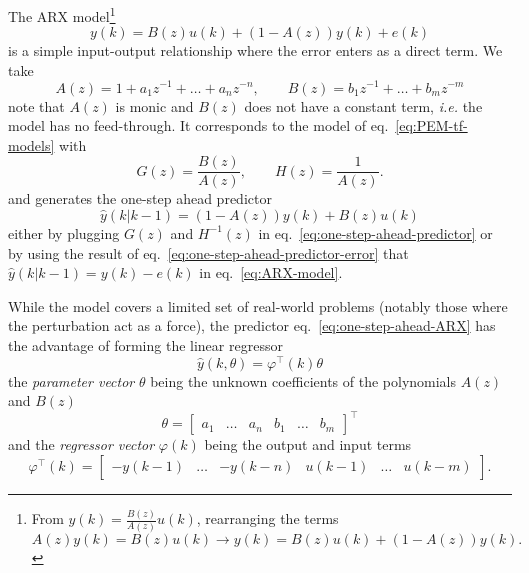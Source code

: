 The ARX model\footnote{From $y(k) = \frac{B(z)}{A(z)}u(k)$, rearranging the terms
  \begin{equation*}
     A(z)y(k) = B(z)u(k) \rightarrow y(k) = B(z)u(k) + (1-A(z))y(k).
  \end{equation*}}
\begin{equation}
  \label{eq:ARX-model}
  y(k) = B(z)u(k) + \left(1-A(z)\right)y(k) + e(k)
\end{equation}
is a simple input-output relationship where the error enters as a direct term. We take
\begin{equation*}
  A(z) = 1 + a_1z^{-1} + \ldots + a_nz^{-n},\hspace{2em} B(z) = b_1z^{-1} + \ldots + b_mz^{-m}
\end{equation*}
note that $A(z)$ is monic and $B(z)$ does not have a constant term, \textit{i.e.} the model has no feed-through. It corresponds to the model of eq.~\eqref{eq:PEM-tf-models} with
\begin{equation*}
  G(z) = \frac{B(z)}{A(z)},\hspace{2em}H(z) = \frac{1}{A(z)}.
\end{equation*}
and generates the one-step ahead predictor
\begin{equation}
  \label{eq:one-step-ahead-ARX}
  \hat{y}(k|k-1) = \left(1-A(z)\right)y(k) + B(z)u(k)
\end{equation}
either by plugging $G(z)$ and $H^{-1}(z)$ in eq.~\eqref{eq:one-step-ahead-predictor} or by using the result of eq.~\eqref{eq:one-step-ahead-predictor-error} that $\hat{y}(k|k-1) = y(k) - e(k)$ in eq.~\eqref{eq:ARX-model}.

While the model covers a limited set of real-world problems (notably those where the perturbation act as a force), the predictor eq.~\eqref{eq:one-step-ahead-ARX} has the advantage of forming the linear regressor
\begin{equation*}
  \hat{y}(k,\theta) = \varphi^\top(k)\theta
\end{equation*}
the \emph{parameter vector} $\theta$ being the unknown coefficients of the polynomials $A(z)$ and $B(z)$
\begin{equation*}
  \theta =
  \begin{bmatrix}
    a_1 & \ldots & a_n & b_1 & \ldots & b_m
  \end{bmatrix}^\top
\end{equation*}
and the \emph{regressor vector} $\varphi(k)$ being the output and input terms
\begin{equation*}
  \varphi^\top(k) =
  \begin{bmatrix}
    -y(k-1) & \ldots & -y(k-n) & u(k-1) & \ldots & u(k-m)
  \end{bmatrix}.
\end{equation*}

